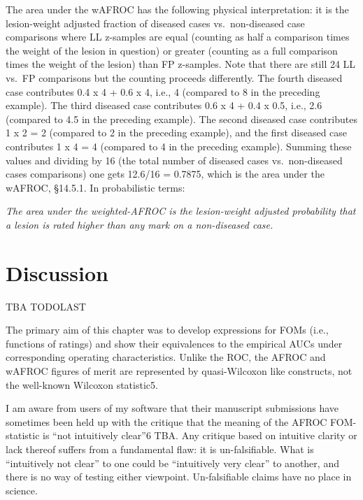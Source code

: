 \documentclass[
]{book}
\begin{document}
The area under the wAFROC has the following physical interpretation: it is the lesion-weight adjusted fraction of diseased cases vs.~non-diseased case comparisons where LL z-samples are equal (counting as half a comparison times the weight of the lesion in question) or greater (counting as a full comparison times the weight of the lesion) than FP z-samples. Note that there are still 24 LL vs.~FP comparisons but the counting proceeds differently. The fourth diseased case contributes 0.4 x 4 + 0.6 x 4, i.e., 4 (compared to 8 in the preceding example). The third diseased case contributes 0.6 x 4 + 0.4 x 0.5, i.e., 2.6 (compared to 4.5 in the preceding example). The second diseased case contributes 1 x 2 = 2 (compared to 2 in the preceding example), and the first diseased case contributes 1 x 4 = 4 (compared to 4 in the preceding example). Summing these values and dividing by 16 (the total number of diseased cases vs.~non-diseased cases comparisons) one gets 12.6/16 = 0.7875, which is the area under the wAFROC, §14.5.1. In probabilistic terms:

\emph{The area under the weighted-AFROC is the lesion-weight adjusted probability that a lesion is rated higher than any mark on a non-diseased case.}

\hypertarget{froc-meanings-Discussion}{%
\section{Discussion}\label{froc-meanings-Discussion}}

TBA
TODOLAST

The primary aim of this chapter was to develop expressions for FOMs (i.e., functions of ratings) and show their equivalences to the empirical AUCs under corresponding operating characteristics. Unlike the ROC, the AFROC and wAFROC figures of merit are represented by quasi-Wilcoxon like constructs, not the well-known Wilcoxon statistic5.

I am aware from users of my software that their manuscript submissions have sometimes been held up with the critique that the meaning of the AFROC FOM-statistic is ``not intuitively clear''6 TBA. Any critique based on intuitive clarity or lack thereof suffers from a fundamental flaw: it is un-falsifiable. What is ``intuitively not clear'' to one could be ``intuitively very clear'' to another, and there is no way of testing either viewpoint. Un-falsifiable claims have no place in science.
\end{document}
